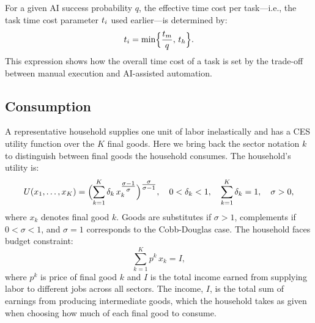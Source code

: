 \documentclass{article}
\theoremstyle{plain}
\theoremstyle{plain}
\begin{document}
For a given AI success probability $q$, the effective time cost per task---i.e., the task time cost parameter $t_{i}$ used earlier---is determined by:
$$t_{i} = \min \Bigl\{\frac{t_{m}}{q},\, t_{h}\Bigr\}.$$
This expression shows how the overall time cost of a task is set by the trade-off between manual execution and AI-assisted automation.

\subsection{Consumption} 
\label{sec:household_GE}
A representative household supplies one unit of labor inelastically and has a CES utility function over the $K$ final goods.
Here we bring back the sector notation $k$ to distinguish between final goods the household consumes. The household's utility is:
\[
U(x_{1}, \ldots, x_{K}) = \Bigl(\sum_{k=1}^{K} \delta_k \,x_k^{\tfrac{\sigma - 1}{\sigma}}\Bigr)^{\tfrac{\sigma}{\sigma-1}},
\quad
0 < \delta_k < 1,
\quad
\sum_{k=1}^{K} \delta_k = 1,
\quad
\sigma > 0,
\]  
where $x_k$ denotes final good $k$.
Goods are substitutes if $ \sigma > 1$, complements if $0 < \sigma < 1$, and $\sigma = 1$ corresponds to the Cobb-Douglas case.  
The household faces budget constraint:  
\[
\sum_{k=1}^K p^k \,x_k = I,
\]  
where $p^k$ is price of final good $k$ and $I$ is the total income earned from supplying labor to different jobs across all sectors.  
The income, $I$, is the total sum of earnings from producing intermediate goods, which the household takes as given when choosing how much of each final good to consume.
\end{document}

